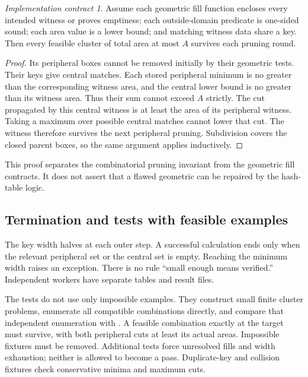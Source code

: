 \documentclass[11pt,a4paper]{article}
\newcommand{\code}[1]{\texttt{\detokenize{#1}}}
\theoremstyle{remark}\newtheorem*{contract}{Implementation contract}\newtheorem*{auditnote}{Audit note}
\begin{document}


\begin{contract}
Assume each geometric fill function encloses every intended witness or proves
emptiness; each outside-domain predicate is one-sided sound; each area value
is a lower bound; and matching witness data share a key. Then every feasible
cluster of total area at most $A$ survives each pruning round.
\end{contract}
\begin{proof}
Its peripheral boxes cannot be removed initially by their geometric tests.
Their keys give central matches. Each stored peripheral minimum is no greater
than the corresponding witness area, and the central lower bound is no greater
than its witness area. Thus their sum cannot exceed $A$ strictly. The cut
propagated by this central witness is at least the area of its peripheral
witness. Taking a maximum over possible central matches cannot lower that
cut. The witness therefore survives the next peripheral pruning. Subdivision
covers the closed parent boxes, so the same argument applies inductively.
\end{proof}

This proof separates the combinatorial pruning invariant from the geometric
fill contracts. It does not assert that a flawed geometric \code{None} can be
repaired by the hash-table logic.

\subsection{Termination and tests with feasible examples}
The key width halves at each outer step. A successful calculation ends only
when the relevant peripheral set or the central set is empty. Reaching the
minimum width raises an exception. There is no rule ``small enough means
verified.'' Independent workers have separate tables and result files.

The tests do not use only impossible examples. They construct small finite
cluster problems, enumerate all compatible combinations directly, and
compare that independent enumeration with \code{mk_one_cencoord}. A feasible
combination exactly at the target must survive, with both peripheral cuts at
least its actual areas. Impossible fixtures must be removed. Additional tests
force unresolved fills and width exhaustion; neither is allowed to become a
pass. Duplicate-key and collision fixtures check conservative minima and
maximum cuts.
\end{document}
